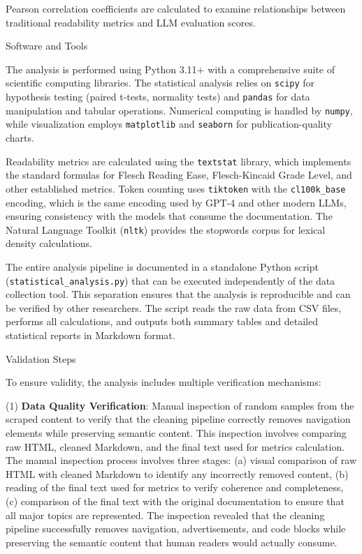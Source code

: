 \documentclass[10pt,conference,a4paper]{IEEEtran}
\makeatletter
\let\oldsubsubsection\subsubsection
\renewcommand{\subsubsection}{%
    \@ifstar{\subsubsectionStar}{\subsubsectionNoStar}%
}
\newcommand{\subsubsectionStar}[1]{%
    \oldsubsubsection*{\textit{#1}}%
}
\newcommand{\subsubsectionNoStar}[1]{%
    \oldsubsubsection{\textit{#1}}%
}
\makeatother
\begin{document}
Pearson correlation coefficients are calculated to examine relationships between traditional readability metrics and LLM evaluation scores.

\subsubsection{Software and Tools}

The analysis is performed using Python 3.11+ with a comprehensive suite of scientific computing libraries. The statistical analysis relies on \texttt{scipy} for hypothesis testing (paired t-tests, normality tests) and \texttt{pandas} for data manipulation and tabular operations. Numerical computing is handled by \texttt{numpy}, while visualization employs \texttt{matplotlib} and \texttt{seaborn} for publication-quality charts.

Readability metrics are calculated using the \texttt{textstat} library, which implements the standard formulas for Flesch Reading Ease, Flesch-Kincaid Grade Level, and other established metrics. Token counting uses \texttt{tiktoken} with the \texttt{cl100k\_base} encoding, which is the same encoding used by GPT-4 and other modern LLMs, ensuring consistency with the models that consume the documentation. The Natural Language Toolkit (\texttt{nltk}) provides the stopwords corpus for lexical density calculations.

The entire analysis pipeline is documented in a standalone Python script (\texttt{statistical\_analysis.py}) that can be executed independently of the data collection tool. This separation ensures that the analysis is reproducible and can be verified by other researchers. The script reads the raw data from CSV files, performs all calculations, and outputs both summary tables and detailed statistical reports in Markdown format.

\subsubsection{Validation Steps}

To ensure validity, the analysis includes multiple verification mechanisms:

(1) \textbf{Data Quality Verification}: Manual inspection of random samples from the scraped content to verify that the cleaning pipeline correctly removes navigation elements while preserving semantic content. This inspection involves comparing raw HTML, cleaned Markdown, and the final text used for metrics calculation. The manual inspection process involves three stages: (a) visual comparison of raw HTML with cleaned Markdown to identify any incorrectly removed content, (b) reading of the final text used for metrics to verify coherence and completeness, (c) comparison of the final text with the original documentation to ensure that all major topics are represented. The inspection revealed that the cleaning pipeline successfully removes navigation, advertisements, and code blocks while preserving the semantic content that human readers would actually consume.
\end{document}
